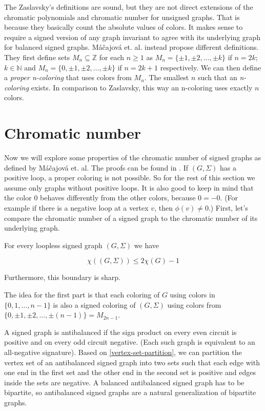 The Zaslavsky's definitions are sound, but they are not direct extensions of the chromatic polynomials and chromatic number for 
unsigned graphs. That is because they basically count the absolute values of colors. It makes sense to require a signed version of any graph invariant to agree with its underlying graph for balanced signed graphs.
Máčajová et. al.\cite{chromatic-number} instead propose different definitions.
They first define sets $M_n \subseteq \mathbb{Z}$ for each $n \geq 1$ as $M_n = \{\pm 1, \pm 2, \dots , \pm k\}$ if $n = 2k$; $k \in \mathbb{N}$
and $M_n = \{0, \pm 1, \pm 2, \dots , \pm k\}$ if $n = 2k + 1$ respectively.
We can then define a \textit{proper n-coloring} that uses colors from $M_n$. The smallest $n$ such that 
an \textit{n-coloring} exists. In comparison to Zaslavsky, this way an n-coloring uses exactly $n$ colors.

\section{Chromatic number}

Now we will explore some properties of the chromatic number of signed graphs as defined by Máčajová et. al. The proofs can be found in \cite{chromatic-number}.
If $(G, \Sigma)$ has a positive loop, a proper coloring is not possible. So for the rest of this section we assume
only graphs without positive loops. It is also good to keep in mind that the color $0$ behaves differently from the other colors, because $0 = -0$. 
(For example if there is a negative loop at a vertex $v$, then $\phi (v) \neq 0$.)
First, let's compare the chromatic number of a signed graph to the chromatic number of its underlying graph.

\begin{theorem}[Máčajová et. al.]
    For every loopless signed graph $(G, \Sigma)$ we have

    $$\chi ((G, \Sigma)) \leq 2 \chi (G) - 1$$

    Furthermore, this boundary is sharp.
\end{theorem}

The idea for the first part is that each coloring of $G$ using colors in $\{0, 1, \dots, n-1\}$
is also a signed coloring of $(G, \Sigma)$ using colors from $\{0, \pm 1, \pm 2, \dots, \pm (n-1)\} = M_{2n-1}$.

A signed graph is antibalanced if the sign product on every even circuit is positive and on every odd circuit negative.
(Each such graph is equivalent to an all-negative signature). Based on \cref{vertex-set-partition}, we can partition the 
vertex set of an antibalanced signed graph into two sets such that each edge with one end in the first set and the other end in the second set is positive and edges inside the sets are negative.
A balanced antibalanced signed graph has to be bipartite, so antibalanced signed graphs are a natural generalization of bipartite graphs.

